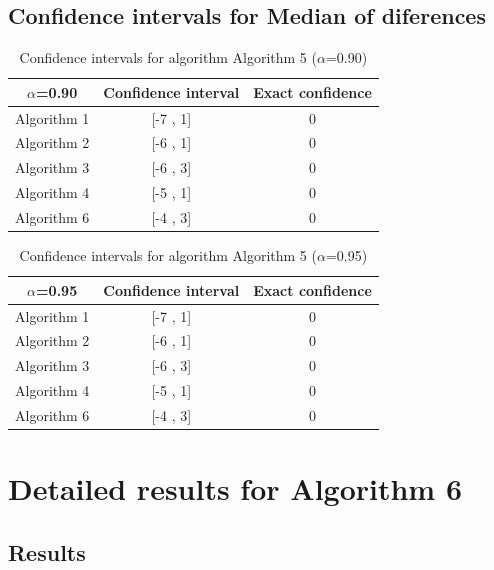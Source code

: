 \documentclass[a4paper,10pt]{article}
\begin{document}
\subsection{Confidence intervals for Median of diferences}

\begin{table}[!htp]
\centering\small
\begin{tabular}{
|c|c|c|}
\hline
 $\alpha$=0.90 & Confidence interval & Exact confidence \\ \hline 
Algorithm 1 & [-7 , 1] & 0\\ \hline 
Algorithm 2 & [-6 , 1] & 0\\ \hline 
Algorithm 3 & [-6 , 3] & 0\\ \hline 
Algorithm 4 & [-5 , 1] & 0\\ \hline 
Algorithm 6 & [-4 , 3] & 0\\ \hline 

\end{tabular}
\caption{Confidence intervals for algorithm Algorithm 5 ($\alpha$=0.90)}
\end{table}
\begin{table}[!htp]
\centering\small
\begin{tabular}{
|c|c|c|}
\hline
 $\alpha$=0.95 & Confidence interval & Exact confidence \\ \hline 
Algorithm 1 & [-7 , 1] & 0\\ \hline 
Algorithm 2 & [-6 , 1] & 0\\ \hline 
Algorithm 3 & [-6 , 3] & 0\\ \hline 
Algorithm 4 & [-5 , 1] & 0\\ \hline 
Algorithm 6 & [-4 , 3] & 0\\ \hline 

\end{tabular}
\caption{Confidence intervals for algorithm Algorithm 5 ($\alpha$=0.95)}
\end{table}

 \clearpage 


\section{Detailed results for Algorithm 6}


\subsection{Results}
\end{document}
